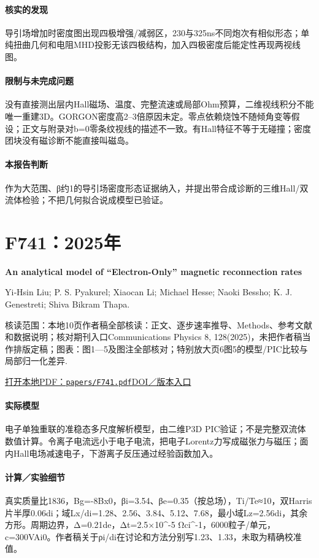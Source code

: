 \paragraph{核实的发现}导引场增加时密度图出现四极增强/减弱区，230与325ns不同炮次有相似形态；单纯扭曲几何和电阻MHD投影无该四极结构，加入四极密度后能定性再现两视线图。

\paragraph{限制与未完成问题}没有直接测出层内Hall磁场、温度、完整流速或局部Ohm预算，二维视线积分不能唯一重建3D。GORGON密度高2–3倍原因未定。零点依赖烧蚀不随倾角变等假设；正文与附录对b=0零条纹视线的描述不一致。有Hall特征不等于无碰撞；密度团块没有磁诊断不能直接叫磁岛。

\paragraph{本报告判断}作为大范围、β约1的导引场密度形态证据纳入，并提出带合成诊断的三维Hall/双流体检验；不把几何拟合说成模型已验证。

\section{F741：2025年}\label{paper:F741}

\textbf{An analytical model of “Electron-Only” magnetic reconnection rates}\citep{F741}\

Yi‐Hsin Liu;  P. S. Pyakurel;  Xiaocan Li;  Michael Hesse;  Naoki Bessho;  K. J. Genestreti;  Shiva Bikram Thapa.

\textsf{核读范围：}本地10页作者稿全部核读：正文、逐步速率推导、Methods、参考文献和数据说明；核对期刊入口Communications Physics 8, 128(2025)，未把作者稿当作排版定稿；\textsf{图表：}图1—5及图注全部核对；特别放大页6图5的模型/PIC比较与局部归一化差异.

\href{run:papers/F741.pdf}{打开本地PDF：\texttt{papers/F741.pdf}}\quad\href{https://doi.org/10.1038/s42005-025-02034-z}{DOI／版本入口}

\paragraph{实际模型}电子单独重联的准稳态多尺度解析模型，由二维P3D PIC验证；不是完整双流体数值计算。令离子电流远小于电子电流，把电子Lorentz力写成磁张力与磁压；面内Hall电场减速电子，下游离子反压通过经验函数加入。

\paragraph{计算／实验细节}真实质量比1836，Bg=-8Bx0，βi=3.54、βe=0.35（按总场），Ti/Te≈10，双Harris片半厚0.06di；域Lx/di=1.28、2.56、3.84、5.12、7.68，最小域Lz=2.56di，其余方形。周期边界，Δ=0.21de，Δt=2.5×10\textasciicircum{}-5 Ωci\textasciicircum{}-1，6000粒子/单元，c=300VAi0。作者稿关于ρi/di在讨论和方法分别写1.23、1.33，未取为精确校准值。

